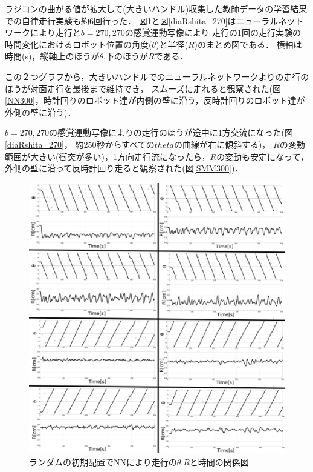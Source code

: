 
ラジコンの曲がる値が拡大して(大きいハンドル)収集した教師データの学習結果での自律走行実験も約6回行った．
図\ref{diaRshita}と図\ref{diaRshita_270}はニューラルネットワークにより走行と$b=270,270$の感覚運動写像により
走行の1回の走行実験の時間変化におけるロボット位置の角度($\theta$)と半径($R$)のまとめ図である．
横軸は時間(s)，縦軸上のほうが$\theta$,下のほうが$R$である．

この２つグラフから，大きいハンドルでのニューラルネットワークよりの走行のほうが対面走行を最後まで維持でき，
スムーズに走れると観察された(図\ref{NN300}，時計回りのロボット達が内側の壁に沿う，反時計回りのロボット達が外側の壁に沿う)．

$b=270,270$の感覚運動写像によりの走行のほうが途中に1方交流になった(図\ref{diaRshita_270}，
約250秒からすべての$theta$の曲線が右に傾斜する)，
$R$の変動範囲が大きい(衝突が多い)，1方向走行流になったら，$R$の変動も安定になって，
外側の壁に沿って反時計回り走ると観察された(図\ref{SMM300})．


\vspace{-1mm}
\begin{figure}[!ht]
    \centering
    \includegraphics[width=1.0\linewidth]{nn_shita_R_rand.eps}
    \caption{ランダムの初期配置でNNにより走行の$\theta$,$R$と時間の関係図}
    \label{diaRshita}
\end{figure}

